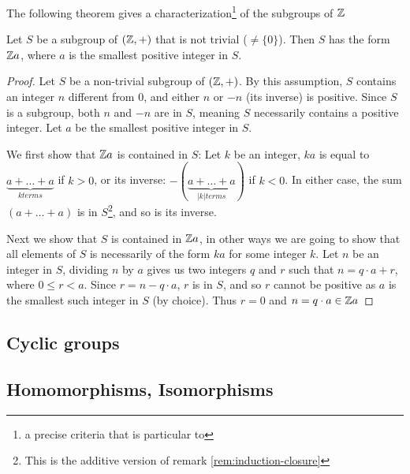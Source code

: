 The following theorem gives a characterization\footnote{a precise criteria that is particular to} of the subgroups of $\mathbb{Z}$
\begin{boxedTheorem}[Subgroups of $(\Z, +)$]
    Let $S$ be a subgroup of $(\Z, +)$ that is not trivial ($\neq \{0\}$). Then $S$ has the form $\mathbb{Z} a$, where $a$ is the smallest positive integer in $S$.
\end{boxedTheorem}
\begin{proof}
    Let $S$ be a non-trivial subgroup of $(\Z, +)$. By this assumption, $S$ contains an integer $n$ different from $0$, and either $n$ or $-n$ (its inverse) is positive. Since $S$ is a subgroup, both $n$ and $-n$ are in $S$, meaning $S$ necessarily contains a positive integer. Let $a$ be the smallest positive integer in $S$.

    We first show that $\mathbb{Z} a$ is contained in $S$: Let $k$ be an integer, $ka$ is equal to $\underbrace{a + \hdots + a}_{k terms}$ if $k > 0$, or its inverse: $-(\underbrace{a + \hdots + a}_{|k| terms})$ if $k < 0$. In either case, the sum $(a + \hdots + a)$ is in $S$\footnote{This is the additive version of remark \ref{rem:induction-closure}}, and so is its inverse. 

    Next we show that $S$ is contained in $\mathbb{Z} a$, in other ways we are going to show that all elements of $S$ is necessarily of the form $ka$ for some integer $k$. Let $n$ be an integer in $S$, dividing $n$ by $a$ gives us two integers $q$ and $r$ such that $n = q\cdot a + r$, where $0 \leq r < a$. Since $r = n - q\cdot a$, $r$ is in $S$, and so $r$ cannot be positive as $a$  is the smallest such integer in $S$ (by choice). Thus $r = 0$ and $n = q\cdot a \in \mathbb{Z} a$
\end{proof}

\subsection{Cyclic groups}
\subsection{Homomorphisms, Isomorphisms}\label{sec:morphisms}